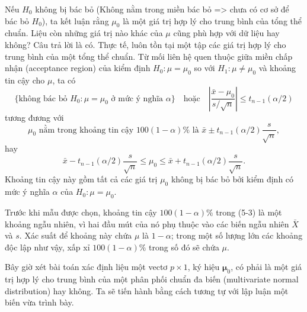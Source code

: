 Nếu \(H_0\) không bị bác bỏ (Không nằm trong miền bác bỏ => chưa có cơ sở để bác bỏ \(H_0\)), ta kết luận rằng \(\mu_0\) là một giá trị hợp lý cho
trung bình của tổng thể chuẩn. Liệu còn những giá trị nào khác của \(\mu\) cũng
phù hợp với dữ liệu hay không? Câu trả lời là có. Thực tế, luôn tồn tại một tập
các giá trị hợp lý cho trung bình của một tổng thể chuẩn. Từ mối liên hệ quen thuộc
giữa miền chấp nhận (acceptance region) của kiểm định
\(H_0: \mu = \mu_0\) so với \(H_1: \mu \ne \mu_0\) và khoảng tin cậy cho \(\mu\), ta có
\[
  \{\text{không bác bỏ } H_0: \mu = \mu_0 \text{ ở mức ý nghĩa } \alpha\}
  \quad\text{hoặc}\quad
  \left|\frac{\bar{x}-\mu_0}{s/\sqrt{n}}\right|
  \le t_{n-1}(\alpha/2)
\]
tương đương với
\[
  \mu_0 \text{ nằm trong khoảng tin cậy } 100(1-\alpha)\%
  \text{ là }
  \bar{x} \pm t_{n-1}(\alpha/2)\frac{s}{\sqrt{n}},
\]
hay
\begin{equation}
  \bar{x} - t_{n-1}(\alpha/2)\frac{s}{\sqrt{n}}
  \le \mu_0 \le
  \bar{x} + t_{n-1}(\alpha/2)\frac{s}{\sqrt{n}}.
\end{equation}
Khoảng tin cậy này gồm tất cả các giá trị \(\mu_0\) không bị bác bỏ bởi kiểm định có
mức ý nghĩa \(\alpha\) của \(H_0: \mu = \mu_0\).

Trước khi mẫu được chọn, khoảng tin cậy \(100(1-\alpha)\%\) trong (5-3) là một
khoảng ngẫu nhiên, vì hai đầu mút của nó phụ thuộc vào các biến ngẫu nhiên
\(\bar{X}\) và \(s\). Xác suất để khoảng này chứa \(\mu\) là \(1-\alpha\); trong một
số lượng lớn các khoảng độc lập như vậy, xấp xỉ \(100(1-\alpha)\%\) trong số đó
sẽ chứa \(\mu\).

Bây giờ xét bài toán xác định liệu một vectơ \(p \times 1\), ký hiệu
\(\boldsymbol{\mu}_0\), có phải là một giá trị hợp lý cho trung bình của một phân
phối chuẩn đa biến (multivariate normal distribution) hay không. Ta sẽ tiến hành
bằng cách tương tự với lập luận một biến vừa trình bày.

